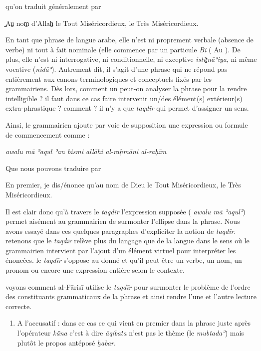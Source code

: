\documentclass[a4paper,12pt]{report}
\begin{document}
\begin{itemize}
\begin{enumerate}
\begin{center}
qu'on traduit généralement par 

   ̠̠̠̠̠̠̠Au̠ nom̠ d’Allah̠ le Tout Miséricordieux, le Très Miséricordieux.
    
\end{center}

En tant que phrase de langue arabe, elle n’est ni proprement verbale (absence  de verbe) ni tout à fait nominale (elle commence par un particule \textit{Bi} ( Au ). De plus, elle n’est  ni interrogative, ni conditionnelle, ni exceptive \textit{istit̠nāʾiya}, ni même vocative (\textit{nidāʾ}). Autrement dit, il s’agit d’une phrase qui ne répond pas entièrement aux canons    terminologiques et conceptuels fixés par les grammairiens. Dès lors, comment un peut-on analyser la phrase pour la rendre intelligible ?  il faut dans ce cas  faire intervenir un/des   élément(s) extérieur(s) extra-phrastique ? comment ?  il n’y a que \textit{taqdīr} qui permet d'assigner un sens. 

Ainsi, le grammairien  ajoute par voie de supposition une expression ou formule de commencement comme :  

\begin{center}
    

     \textit{ awalu mā ʾaqul ʾan bismi allāhi al-raḥmāni al-raḥīm} 
     
    		Que nous pouvons traduire  par
      
      En premier, je dis/énonce qu’au nom de Dieu  le Tout Miséricordieux, le Très Miséricordieux. 

\end{center}

Il est clair donc qu’à travers le \textit{taqdīr}  l’expression supposée (     \textit{ awalu mā ʾaqulʾ}) permet aisément au grammairien de surmonter l’ellipse  dans la phrase. Nous avons essayé dans ces quelques paragraphes d’expliciter la notion de \textit{taqdīr}. retenons que  le \textit{taqd\=ir }  relève plus du langage que de la langue dans le sens où le grammairien intervient par l’ajout d’un élément virtuel pour interpréter  les énoncées.  le \textit{taqd\=ir }  s’oppose au donné et  qu’il peut être un verbe, un nom, un pronom ou encore une expression entière selon le contexte. 

voyons comment  al-F\=aris\=i utilise le \textit{taqd\=ir } pour surmonter le problème de l'ordre des constituants grammaticaux de la phrase et ainsi rendre l'une et l'autre lecture correcte.

\begin{enumerate}
    \item    A l'accusatif :   dans ce cas ce qui vient en premier dans la phrase juste après l'opérateur \textit{kā̄na} c'est à dire \textit{āqibata} n'est pas  le thème (le \textit{mubtadaʾ}) mais plutôt le propos antéposé \textit{ḫabar}. 


\end{enumerate}
\end{enumerate}
\end{itemize}
\end{document}
